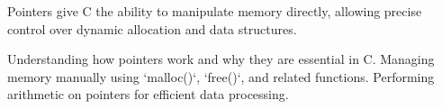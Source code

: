 \begin{comment}
3.4.2.2 Flexible Memory Alignment Techniques

3.5 C11 (2011 - 2018) – Thread-Safe Memory Handling
3.5.1 Introduction of Atomics and Multi-threaded Safety

3.5.1.1 Lock-Free Memory Access

3.5.1.2 Understanding Shared Memory in Multi-threaded Programs

3.5.2 Bounds Checking and Safer Allocations

3.5.2.1 _Alignas and _Alignof for Memory Alignment

3.5.2.2 _Atomic for Safe Concurrent Memory Access

3.6 C17 and Beyond – Refinements and Future Directions
3.6.1 Improved Compiler Handling of Memory Errors

3.6.1.1 Advanced Static Analysis for Buffer Overflows

3.6.1.2 Detection of Uninitialized Memory Reads

3.6.2 Future of Memory Management in C

3.6.2.1 Potential Integrations with Rust-like Safe Memory Models

3.6.2.2 Alternatives to Manual Allocation for Security
\end{comment}

\begin{NxSBox}
	\begin{NxIDBox}
		Pointers give C the ability to manipulate memory directly, allowing precise control over dynamic allocation and data structures.
	\end{NxIDBox}
	\begin{NxIDBoxL}
		 Understanding how pointers work and why they are essential in C.
		 Managing memory manually using `malloc()`, `free()`, and related functions.
		 Performing arithmetic on pointers for efficient data processing.
	\end{NxIDBoxL}
\end{NxSBox}

